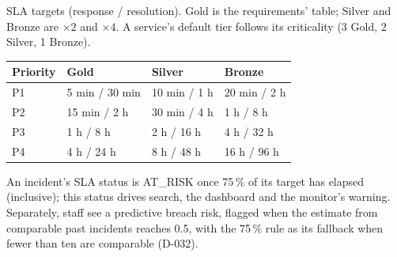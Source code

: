 SLA targets (response / resolution). Gold is the requirements' table; Silver and Bronze are
$\times 2$ and $\times 4$. A service's default tier follows its criticality (3 Gold, 2 Silver,
1 Bronze).

\begin{center}\small
\begin{tabular}{@{}llll@{}}
\toprule
\textbf{Priority} & \textbf{Gold} & \textbf{Silver} & \textbf{Bronze} \\
\midrule
P1 & 5 min / 30 min & 10 min / 1 h & 20 min / 2 h \\
P2 & 15 min / 2 h & 30 min / 4 h & 1 h / 8 h \\
P3 & 1 h / 8 h & 2 h / 16 h & 4 h / 32 h \\
P4 & 4 h / 24 h & 8 h / 48 h & 16 h / 96 h \\
\bottomrule
\end{tabular}
\end{center}

An incident's SLA status is AT\_RISK once 75\,\% of its target has elapsed (inclusive); this
status drives search, the dashboard and the monitor's warning. Separately, staff see a predictive
breach risk, flagged when the estimate from comparable past incidents reaches 0.5, with the
75\,\% rule as its fallback when fewer than ten are comparable (D-032).

